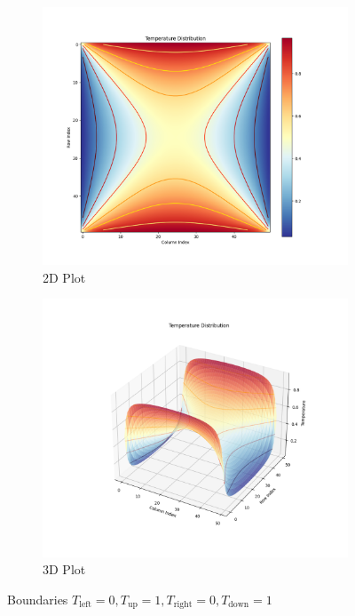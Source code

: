 \documentclass{article}
\begin{document}
\begin{figure}[H]
  \begin{subfigure}{0.45\textwidth}
    \includegraphics[width=\linewidth]{figures/Figure_3.png}
    \caption{2D Plot}
  \end{subfigure}
  \hfill
  \begin{subfigure}{0.45\textwidth}
    \includegraphics[width=\linewidth]{figures/Figure_4.png}
    \caption{3D Plot}
  \end{subfigure}
  \caption{Boundaries $T_{\text{left}}=0, T_{\text{up}}=1, T_{\text{right}}=0, T_{\text{down}}=1$}
\end{figure}
\end{document}
